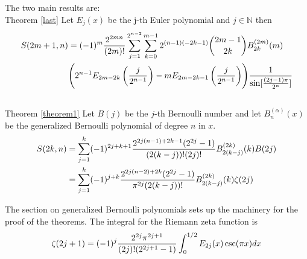 \documentclass[fleqn,a4paper,9pt]{article}
\begin{document}
\begin{flushleft}
The two main results are:\\
Theorem \ref{last}
Let $E_j(x)$ be the j-th Euler polynomial and $j\in\mathbb{N}$ then
\begin{align}
S(2m+1,n)&=(-1)^m\frac{2^{2mn}}{(2m)!}\sum_{j=1}^{2^{n-2}}\sum_{k=0}^{m-1}2^{(n-1)(-2k-1)}\binom{2m-1}{2k}B_{2k}^{(2m)}(m)\\\notag
&\Biggl(2^{n-1}E_{2m-2k}\left(\frac{j}{2^{n-1}}\right)-mE_{2m-2k-1}\left(\frac{j}{2^{n-1}}\right)\Biggr)\frac{1}{\sin[\frac{(2j-1)\pi}{2^n}]}\\\notag
\end{align}
Theorem \ref {theorem1}
 Let $B(j)$ be the $j$-th Bernoulli number and let $B_n^{(\alpha)}(x)$ be the generalized Bernoulli polynomial of degree $n$ in $x$.
\begin{align}\notag
S(2 k,n)&=\sum_{j=1}^k(-1)^{2j+k+1}\frac{2^{2j(n-1)+2k-1}(2^{2j}-1)}{(2(k-j))!(2j)!}B_{2(k-j)}^{(2k)}(k) B(2 j)\\\notag
&=\sum_{j=1}^k(-1)^{j+k}\frac{2^{2j(n-2)+2k}(2^{2j}-1)}{\pi^{2j}(2(k-j))!}B_{2(k-j)}^{(2k)}(k) \zeta(2 j)\\\label{sumsine}
\end{align}

The section on generalized Bernoulli polynomials sets up the machinery for the proof of the theorems.
The integral for the Riemann zeta function is
\begin{align}
\zeta(2j+1)&=(-1)^j\frac{2^{2j}\pi^{2j+1}}{(2j)!(2^{2j+1}-1)}\int_{0}^{1/2}E_{2j}(x)\csc (\pi  x)dx\\\notag
\end{align}

\end{flushleft}
\end{document}
